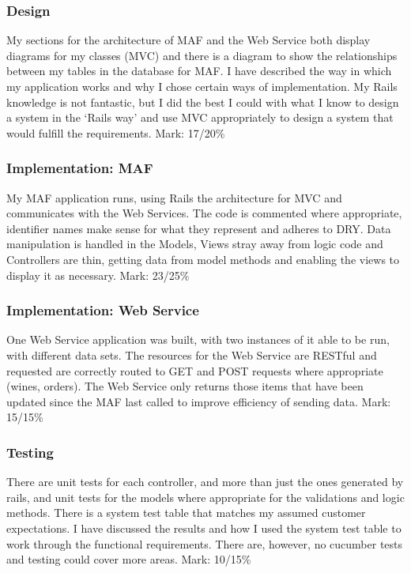 \documentclass[12pt]{article}
\begin{document}
\subsubsection{Design}
My sections for the architecture of MAF and the Web Service both display diagrams for my classes (MVC) and there is a diagram to show the relationships between my tables in the database for MAF. I have described the way in which my application works and why I chose certain ways of implementation. My Rails knowledge is not fantastic, but I did the best I could with what I know to design a system in the `Rails way' and use MVC appropriately to design a system that would fulfill the requirements.
\newline
Mark: 17/20\%

\subsubsection{Implementation: MAF}
My MAF application runs, using Rails the architecture for MVC and communicates with the Web Services. The code is commented where appropriate, identifier names make sense for what they represent and adheres to DRY. Data manipulation is handled in the Models, Views stray away from logic code and Controllers are thin, getting data from model methods and enabling the views to display it as necessary.
\newline
Mark: 23/25\%

\subsubsection{Implementation: Web Service}
One Web Service application was built, with two instances of it able to be run, with different data sets. The resources for the Web Service are RESTful and requested are correctly routed to GET and POST requests where appropriate (wines, orders). The Web Service only returns those items that have been updated since the MAF last called to improve efficiency of sending data.
\newline
Mark: 15/15\%

\subsubsection{Testing}
There are unit tests for each controller, and more than just the ones generated by rails, and unit tests for the models where appropriate for the validations and logic methods. There is a system test table that matches my assumed customer expectations. I have discussed the results and how I used the system test table to work through the functional requirements. There are, however, no cucumber tests and testing could cover more areas.
\newline
Mark: 10/15\%
\end{document}
